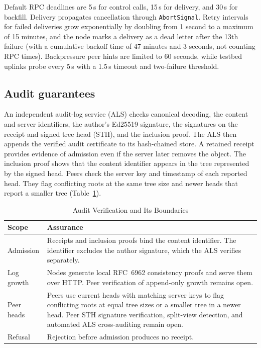 \documentclass[conference,a4paper,10pt]{IEEEtran}
\begin{document}
Default RPC deadlines are 5\,s for control calls, 15\,s for delivery, and 30\,s for backfill. Delivery propagates cancellation through \texttt{AbortSignal}. Retry intervals for failed deliveries grow exponentially by doubling from 1 second to a maximum of 15 minutes, and the node marks a delivery as a dead letter after the 13th failure (with a cumulative backoff time of 47 minutes and 3 seconds, not counting RPC times). Backpressure peer hints are limited to 60 seconds, while testbed uplinks probe every 5\,s with a 1.5\,s timeout and two-failure threshold.

\subsection{Audit guarantees}

An independent audit-log service (ALS) checks canonical decoding, the content and server identifiers, the author's Ed25519 signature, the signatures on the receipt and signed tree head (STH), and the inclusion proof. The ALS then appends the verified audit certificate to its hash-chained store. A retained receipt provides evidence of admission even if the server later removes the object. The inclusion proof shows that the content identifier appears in the tree represented by the signed head. Peers check the server key and timestamp of each reported head. They flag conflicting roots at the same tree size and newer heads that report a smaller tree (Table~\ref{tab:audit}).

\begin{table}[!t]
  \caption{Audit Verification and Its Boundaries}
  \label{tab:audit}
  \centering
  {\footnotesize
  \begin{tabularx}{\columnwidth}{@{}p{}X@{}}
    \toprule
    Scope & Assurance \\
    \midrule
    Admission & Receipts and inclusion proofs bind the content identifier. The identifier excludes the author signature, which the ALS verifies separately. \\
    Log growth & Nodes generate local RFC~6962 consistency proofs and serve them over HTTP. Peer verification of append-only growth remains open. \\
    Peer heads & Peers use current heads with matching server keys to flag conflicting roots at equal tree sizes or a smaller tree in a newer head. Peer STH signature verification, split-view detection, and automated ALS cross-auditing remain open. \\
    Refusal & Rejection before admission produces no receipt. \\
    \bottomrule
  \end{tabularx}}
\end{table}
\end{document}
